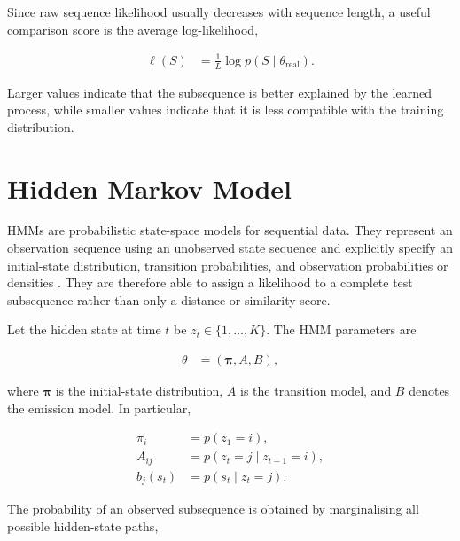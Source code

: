 \documentclass[a4paper]{article}
\begin{document}
        Since raw sequence likelihood usually decreases with sequence length, a useful comparison score is the average log-likelihood,

        \begin{align}
            \ell(S)
            &=
            \frac{1}{L}
            \log p(S\mid\theta_{\mathrm{real}}).
        \end{align}

        \noindent
        Larger values indicate that the subsequence is better explained by the learned process, while smaller values indicate that it is less compatible with the training distribution.

    \section{Hidden Markov Model}

        HMMs are probabilistic state-space models for sequential data. They represent an observation sequence using an unobserved state sequence and explicitly specify an initial-state distribution, transition probabilities, and observation probabilities or densities \cite{murphy-2002-dynamic-bayesian-networks-representation-inference-and-learning}. They are therefore able to assign a likelihood to a complete test subsequence rather than only a distance or similarity score.

        Let the hidden state at time \(t\) be \(z_t\in\{1,\dots,K\}\). The HMM parameters are

        \begin{align}
            \theta
            &=
            (\boldsymbol{\pi},A,B),
        \end{align}

        \noindent
        where \(\boldsymbol{\pi}\) is the initial-state distribution, \(A\) is the transition model, and \(B\) denotes the emission model. In particular,

        \begin{align}
            \pi_i
            &=
            p(z_1=i),\\
            A_{ij}
            &=
            p(z_t=j\mid z_{t-1}=i),\\
            b_j(s_t)
            &=
            p(s_t\mid z_t=j).
        \end{align}

        \noindent
        The probability of an observed subsequence is obtained by marginalising all possible hidden-state paths,
\end{document}
